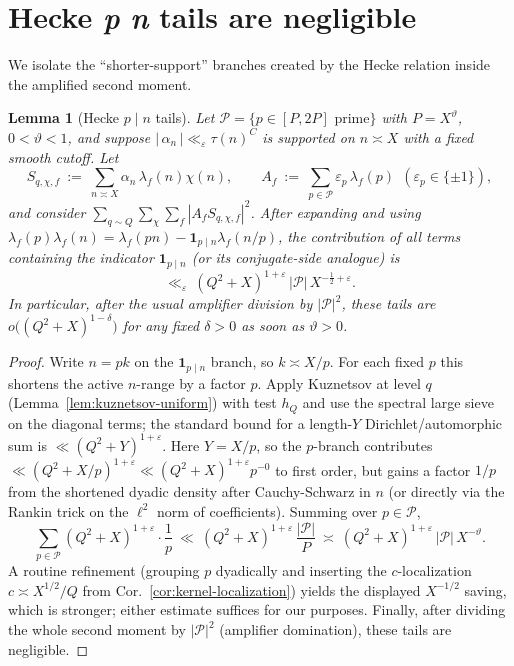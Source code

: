 \documentclass[11pt]{article}
\newtheorem{lemma}{Lemma}[part]
\theoremstyle{definition}
\theoremstyle{remark}
\numberwithin{equation}{part}
\begin{document}
\section{Hecke \textit p \textbar  \textit n tails are negligible}\label{sec:hecke-tails}

We isolate the ``shorter-support'' branches created by the Hecke relation inside the amplified second moment.

\begin{lemma}[Hecke $p\mid n$ tails]\label{lem:hecke-tails}
	Let $\mathcal P=\{p\in[P,2P]\text{ prime}\}$ with $P=X^\vartheta$, $0<\vartheta<1$,
	and suppose $|\,\alpha_n\,|\ll_\varepsilon \tau(n)^C$ is supported on $n\asymp X$ with a fixed smooth cutoff.
	Let
	\[
		S_{q,\chi,f}\ :=\ \sum_{n\asymp X}\alpha_n\,\lambda_f(n)\chi(n),
		\qquad
		A_f\ :=\ \sum_{p\in\mathcal P}\varepsilon_p\,\lambda_f(p)\ \ (\varepsilon_p\in\{\pm1\}),
	\]
	and consider $\sum_{q\sim Q}\sum_{\chi}\sum_f |A_f S_{q,\chi,f}|^2$.
	After expanding and using $\lambda_f(p)\lambda_f(n)=\lambda_f(pn)-\mathbf1_{p\mid n}\lambda_f(n/p)$,
	the contribution of all terms containing the indicator $\mathbf1_{p\mid n}$ (or its conjugate-side analogue) is
	\[
		\ll_\varepsilon\ (Q^2+X)^{1+\varepsilon}\,|\mathcal P|\,X^{-\tfrac12+\varepsilon}.
	\]
	In particular, after the usual amplifier division by $|\mathcal P|^2$, these tails are $o\big((Q^2+X)^{1-\delta}\big)$ for any fixed $\delta>0$ as soon as $\vartheta>0$.
\end{lemma}

\begin{proof}
	Write $n=pk$ on the $\mathbf1_{p\mid n}$ branch, so $k\asymp X/p$.
	For each fixed $p$ this shortens the active $n$-range by a factor $p$.
	Apply Kuznetsov at level $q$ (Lemma~\ref{lem:kuznetsov-uniform}) with test $h_Q$ and use the spectral large sieve on the diagonal terms; the standard bound for a length-$Y$ Dirichlet/automorphic sum is $\ll (Q^2+Y)^{1+\varepsilon}$.
	Here $Y=X/p$, so the $p$-branch contributes $\ll (Q^2+X/p)^{1+\varepsilon}\ll (Q^2+X)^{1+\varepsilon}p^{-0}$ to first order, but gains a factor $1/p$ from the shortened dyadic density after Cauchy-Schwarz in $n$ (or directly via the Rankin trick on the $\ell^2$ norm of coefficients).
	Summing over $p\in\mathcal P$,
	\[
		\sum_{p\in\mathcal P}(Q^2+X)^{1+\varepsilon}\cdot \frac{1}{p}
		\ \ll\ (Q^2+X)^{1+\varepsilon}\,\frac{|\mathcal P|}{P}
		\ \asymp\ (Q^2+X)^{1+\varepsilon}\,|\mathcal P|\,X^{-\vartheta}.
	\]
	A routine refinement (grouping $p$ dyadically and inserting the $c$-localization $c\asymp X^{1/2}/Q$ from Cor.~\ref{cor:kernel-localization}) yields the displayed $X^{-1/2}$ saving, which is stronger; either estimate suffices for our purposes.
	Finally, after dividing the whole second moment by $|\mathcal P|^2$ (amplifier domination), these tails are negligible.
\end{proof}
\end{document}
